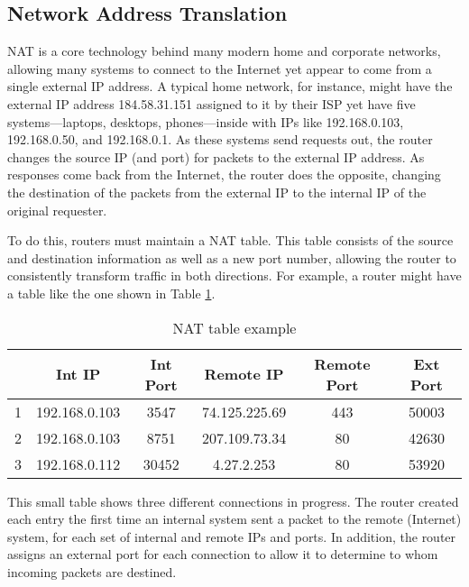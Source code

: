 \subsection{Network Address Translation}
\label{sec:nat}
\par \ac{NAT} is a core technology behind many modern home and corporate networks, allowing many systems to connect to the Internet yet appear to come from a single external \ac{IP} address. A typical home network, for instance, might have the external IP address 184.58.31.151 assigned to it by their \ac{ISP} yet have five systems---laptops, desktops, phones---inside with \acp{IP} like 192.168.0.103, 192.168.0.50, and 192.168.0.1. As these systems send requests out, the router changes the source IP (and port) for packets to the external IP address. As responses come back from the Internet, the router does the opposite, changing the destination of the packets from the external IP to the internal IP of the original requester.

\par To do this, routers must maintain a \ac{NAT} table. This table consists of the source and destination information as well as a new port number, allowing the router to consistently transform traffic in both directions. For example, a router might have a table like the one shown in Table \ref{tab:nat_example}.

\begin{table}
\caption{\ac{NAT} table example}
\label{tab:nat_example}
\centering
\begin{tabular}{r|ccccc}
  & \textbf{Int IP}  & \textbf{Int Port}  & \textbf{Remote IP}  & \textbf{Remote Port}  & \textbf{Ext Port} \\
\hline
1 & 192.168.0.103 & 3547 & 74.125.225.69 & 443 & 50003\\
2 & 192.168.0.103 & 8751 & 207.109.73.34 & 80 & 42630\\
3 & 192.168.0.112 & 30452 & 4.27.2.253 & 80 & 53920
\end{tabular}
\end{table}

\par This small table shows three different connections in progress. The router created each entry the first time an internal system sent a packet to the remote (Internet) system, for each set of internal and remote \acp{IP} and ports. In addition, the router assigns an external port for each connection to allow it to determine to whom incoming packets are destined.


